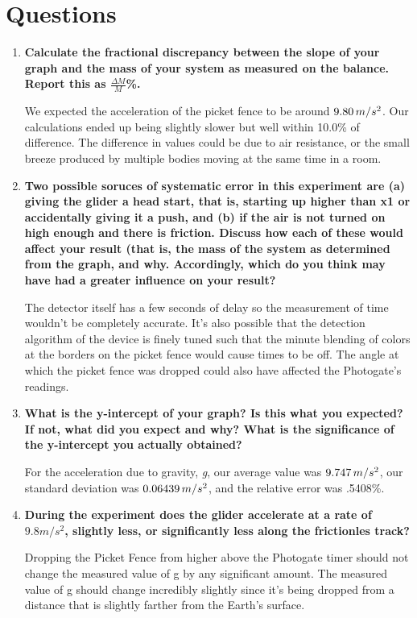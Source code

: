 
 \section{Questions}

\vspace{-0.5cm}
\singlespacing

\begin{enumerate}
	\item \textbf{Calculate the fractional discrepancy between the slope of your graph and the mass of your system as measured on the balance. Report this as $\frac{\Delta{M}}{M}$\%.}

		We expected the acceleration of the picket fence to be around $9.80\thinspace{m/s^2}$. Our calculations ended up being slightly slower but well within 10.0\% of difference. The difference in values could be due to air resistance, or the small breeze produced by multiple bodies moving at the same time in a room.

	\item \textbf{Two possible soruces of systematic error in this experiment are (a) giving the glider a head start, that is, starting up higher than x1 or accidentally giving it a push, and (b) if the air is not turned on high enough and there is friction. Discuss how each of these would affect your result (that is, the mass of the system as determined from the graph, and why. Accordingly, which do you think may have had a greater influence on your result?}

	The detector itself has a few seconds of delay so the measurement of time wouldn't be completely accurate. It's also possible that the detection algorithm of the device is finely tuned such that the minute blending of colors at the borders on the picket fence would cause times to be off. The angle at which the picket fence was dropped could also have affected the Photogate's readings.

\item \textbf{What is the y-intercept of your graph? Is this what you expected? If not, what did you expect and why? What is the significance of the y-intercept you actually obtained?}

		For the acceleration due to gravity, \textit{g}, our average value was \textbf{$9.747\thinspace{m/s^2}$}, our standard deviation was \textbf{$0.06439\thinspace{m/s^2}$}, and the relative error was .5408\%.

\item \textbf{During the experiment does the glider accelerate at a rate of $9.8 m/s^2$, slightly less, or significantly less along the frictionles track?}

	Dropping the Picket Fence from higher above the Photogate timer should not change the measured value of g by any significant amount. The measured value of g should change incredibly slightly since it's being dropped from a distance that is slightly farther from the Earth's surface.

\end{enumerate}


